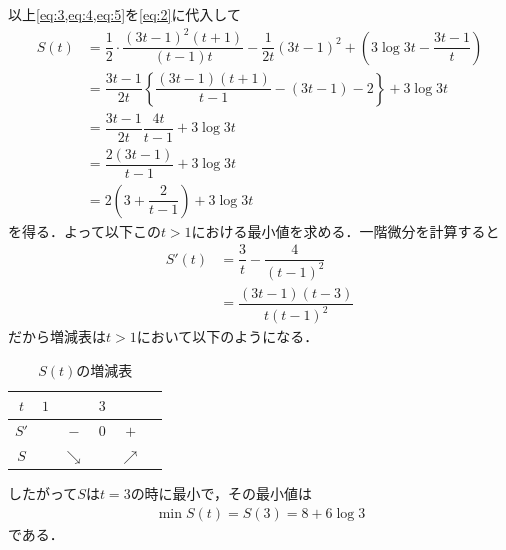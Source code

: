 \documentclass[../../main.tex]{subfiles}
\begin{document}
以上\cref{eq:3,eq:4,eq:5}を\cref{eq:2}に代入して
\begin{align}
  S(t)
  &= \dfrac{1}{2}\cdot\dfrac{(3t-1)^2(t+1)}{(t-1)t} - \dfrac{1}{2t}\left(3t-1\right)^2 + \left(3\log3t-\dfrac{3t-1}{t}\right) \\
  &= \dfrac{3t-1}{2t}\left\{\dfrac{(3t-1)(t+1)}{t-1}-(3t-1) -2 \right\} + 3\log3t \\
  &= \dfrac{3t-1}{2t}\dfrac{4t}{t-1} + 3\log3t \\
  &= \dfrac{2(3t-1)}{t-1}+ 3\log3t \\
  &= 2\left(3+\dfrac{2}{t-1}\right) + 3\log 3t \label{eq:6}
\end{align}
を得る．よって以下この$t>1$における最小値を求める．一階微分を計算すると
\begin{align}
  S'(t)
  &=\dfrac{3}{t}-\dfrac{4}{(t-1)^2} \\
  &=\dfrac{(3t-1)(t-3)}{t(t-1)^2}
\end{align}
だから増減表は$t>1$において以下のようになる．

\begin{table}[htb]
  \begin{center}
    \caption{$S(t)$の増減表}
    \begin{tabular}{c|ccccc}
      $t$ & $1$ & & $3$ & & \\
      \hline
      $S'$ & & $-$ & $0$ & $+$ & \\
      \hline
      $S$ & & $\searrow$ & & $\nearrow$ &
    \end{tabular}
  \end{center}
\end{table}

したがって$S$は$t=3$の時に最小で，その最小値は
\begin{align}
  \min S(t)=S(3)=8+6\log3
\end{align}
である．
\end{document}
